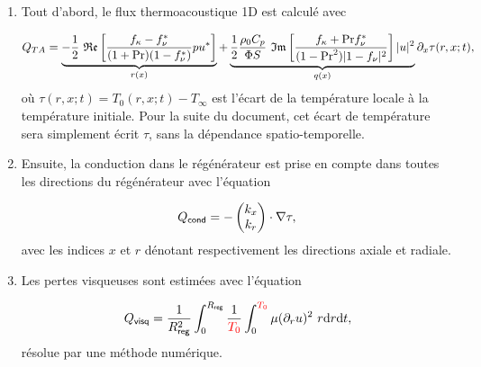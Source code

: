 \begin{enumerate}[label=\textbf{(\roman*)}]
\item Tout d'abord, le flux thermoacoustique 1D est calculé avec

\begin{equation}
Q_{TA} = \underbrace{ -\frac12~\mathfrak{Re}\left[ \frac{ f_\kappa-f_\nu^* }{ (1+\mathrm{Pr})(1-f_\nu^*) } pu^* \right] }_{r(x)} + \underbrace{ \frac12 \frac{\rho_0 C_p}{\Phi S}~\mathfrak{Im}\left[ \frac{f_\kappa + \mathrm{Pr} f_\nu^*}{(1-\mathrm{Pr}^2)|1-f_\nu|^2} \right] |u|^2 }_{q(x)}\partial_x \tau(r,x;t),
\label{eq:FluxTA_Lotton_Regen}
\end{equation}
où $\tau(r,x;t) = T_0(r,x;t)-T_\infty$ est l'écart de la température locale à la température initiale. Pour la suite du document, cet écart de température sera simplement écrit $\tau$, sans la dépendance spatio-temporelle. 

\item Ensuite, la conduction dans le régénérateur est prise en compte dans toutes les directions du régénérateur avec l'équation

\begin{equation}
	Q_{\sf cond} = -\begin{pmatrix}
	k_x\\
	k_r
	\end{pmatrix} \cdot \nabla \tau,
	\label{eq:FluxCond_Lotton}
\end{equation}
avec les indices $x$ et $r$ dénotant respectivement les directions axiale et radiale.

%
%

\item Les pertes visqueuses sont estimées avec l'équation

\begin{equation}
Q_{\sf visq} = \frac{1}{R_{\sf reg}^2} \int_0^{R_{\sf reg}} \frac{1}{\textcolor{red}{T_0}} \int_0^{\textcolor{red}{T_0}} \mu (\partial_r u)^2\ r \mathrm{d} r \mathrm{d} t,
\label{eq:FluxVisq_Lotton}
\end{equation}
résolue par une méthode numérique.


\end{enumerate}
